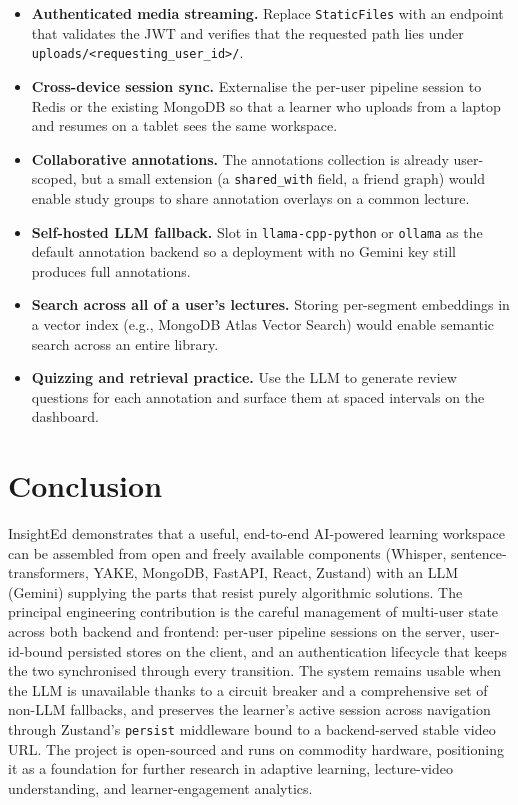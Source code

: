 \documentclass[conference]{IEEEtran}
\begin{document}
\begin{itemize}
    \item \textbf{Authenticated media streaming.} Replace \texttt{StaticFiles} with an endpoint that validates the JWT and verifies that the requested path lies under \texttt{uploads/<requesting\_user\_id>/}.
    \item \textbf{Cross-device session sync.} Externalise the per-user pipeline session to Redis or the existing MongoDB so that a learner who uploads from a laptop and resumes on a tablet sees the same workspace.
    \item \textbf{Collaborative annotations.} The annotations collection is already user-scoped, but a small extension (a \texttt{shared\_with} field, a friend graph) would enable study groups to share annotation overlays on a common lecture.
    \item \textbf{Self-hosted LLM fallback.} Slot in \texttt{llama-cpp-python} or \texttt{ollama} as the default annotation backend so a deployment with no Gemini key still produces full annotations.
    \item \textbf{Search across all of a user's lectures.} Storing per-segment embeddings in a vector index (e.g., MongoDB Atlas Vector Search) would enable semantic search across an entire library.
    \item \textbf{Quizzing and retrieval practice.} Use the LLM to generate review questions for each annotation and surface them at spaced intervals on the dashboard.
\end{itemize}

\section{Conclusion}\label{sec:conclusion}

InsightEd demonstrates that a useful, end-to-end AI-powered learning workspace can be assembled from open and freely available components (Whisper, sentence-transformers, YAKE, MongoDB, FastAPI, React, Zustand) with an LLM (Gemini) supplying the parts that resist purely algorithmic solutions. The principal engineering contribution is the careful management of multi-user state across both backend and frontend: per-user pipeline sessions on the server, user-id-bound persisted stores on the client, and an authentication lifecycle that keeps the two synchronised through every transition. The system remains usable when the LLM is unavailable thanks to a circuit breaker and a comprehensive set of non-LLM fallbacks, and preserves the learner's active session across navigation through Zustand's \texttt{persist} middleware bound to a backend-served stable video URL. The project is open-sourced and runs on commodity hardware, positioning it as a foundation for further research in adaptive learning, lecture-video understanding, and learner-engagement analytics.
\end{document}
